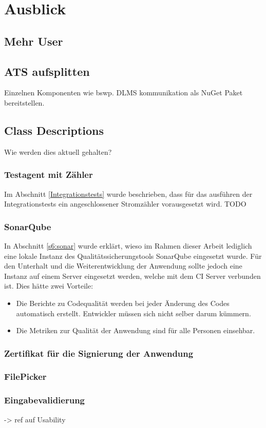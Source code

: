 
\chapter{Ausblick}

\section{Mehr User}

\section{ATS aufsplitten}\label{ausblick:ats_split}
Einzelnen Komponenten wie bswp. DLMS kommunikation als NuGet Paket bereitstellen.


\section{Class Descriptions}
Wie werden dies aktuell gehalten?


\subsection{Testagent mit Zähler}
Im Abschnitt \ref{Integrationstests} wurde beschrieben, dass für das ausführen der Integrationstests ein angeschlossener Stromzähler vorausgesetzt wird.
TODO

\subsection{SonarQube}
In Abschnitt \ref{s6:sonar} wurde erklärt, wieso im Rahmen dieser Arbeit lediglich eine lokale Instanz des Qualitätssicherungstools SonarQube eingesetzt wurde.
Für den Unterhalt und die Weiterentwicklung der Anwendung sollte jedoch eine Instanz auf einem Server eingesetzt werden, welche mit dem \ac{CI} Server verbunden ist.
Dies hätte zwei Vorteile:
\begin{itemize}
   \item Die Berichte zu Codequalität werden bei jeder Änderung des Codes automatisch erstellt. 
Entwickler müssen sich nicht selber darum kümmern.
   \item Die Metriken zur Qualität der Anwendung sind für alle Personen einsehbar.
\end{itemize}

\subsection{Zertifikat für die Signierung der Anwendung}\label{ausblick:cert}

\subsection{FilePicker}\label{ausblick:filePicker}


\subsection{Eingabevalidierung}
-> ref auf Usability